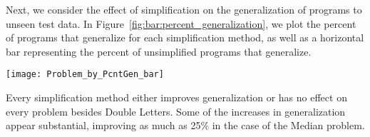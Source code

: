 
Next, we consider the effect of simplification on the generalization of programs to unseen test data. In Figure~\ref{fig:bar:percent_generalization}, we plot the percent of programs that generalize for each simplification method, as well as a horizontal bar representing the percent of unsimplified programs that generalize.

\begin{figure*}[t] %
\centering
\texttt{[image: Problem\_by\_PcntGen\_bar]} %
\caption{The proportion of simplified programs that generalize to unseen data
	for each problem, with the proportion of unchanged programs that generalize 
	indicated with black horizontal bars.
    The number of unchanged programs taken into account for each problem
    is given in parentheses, representing the number of starting points for each problem.
}
\label{fig:bar:percent_generalization}
\end{figure*}

Every simplification method either improves generalization or has no effect on every problem besides Double Letters.
 Some of the increases in generalization appear substantial, 
improving as much as 25\% in the case of the Median problem.

